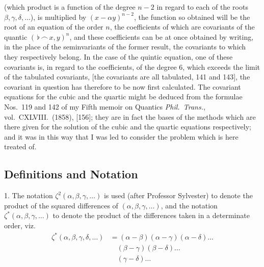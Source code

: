 \documentclass[11pt,a4paper]{article}
\theoremstyle{definition}
\begin{document}
(which product is a function of the degree $n-2$ in regard to each of the roots $\beta,\gamma,\delta,\ldots$), is multiplied by $(x-\alpha y)^{n-2}$, the function so obtained will be the root of an equation of the order $n$, the coefficients of which are covariants of the quantic $(\,\flat\,\frown\, x,y)^n$, and these coefficients can be at once obtained by writing, in the place of the seminvariants of the former result, the covariants to which they respectively belong. In the case of the quintic equation, one of these covariants is, in regard to the coefficients, of the degree 6, which exceeds the limit of the tabulated covariants, [the covariants are all tabulated, 141 and 143], the covariant in question has therefore to be now first calculated. The covariant equations for the cubic and the quartic might be deduced from the formulae Nos.~119 and 142 of my Fifth memoir on Quantics \textit{Phil.\ Trans.}, vol.~CXLVIII.\ (1858), [156]; they are in fact the bases of the methods which are there given for the solution of the cubic and the quartic equations respectively; and it was in this way that I was led to consider the problem which is here treated of.

\subsection*{Definitions and Notation}

1. The notation $\zeta^2(\alpha,\beta,\gamma,\ldots)$ is used (after Professor Sylvester) to denote the product of the squared differences of $(\alpha,\beta,\gamma,\ldots)$, and the notation $\zeta^*(\alpha,\beta,\gamma,\ldots)$ to denote the product of the differences taken in a determinate order, viz.
\begin{align*}
\zeta^*(\alpha,\beta,\gamma,\delta,\ldots) &= (\alpha-\beta)(\alpha-\gamma)(\alpha-\delta)\ldots\\
&\quad(\beta-\gamma)(\beta-\delta)\ldots\\
&\quad(\gamma-\delta)\ldots
\end{align*}
\end{document}
